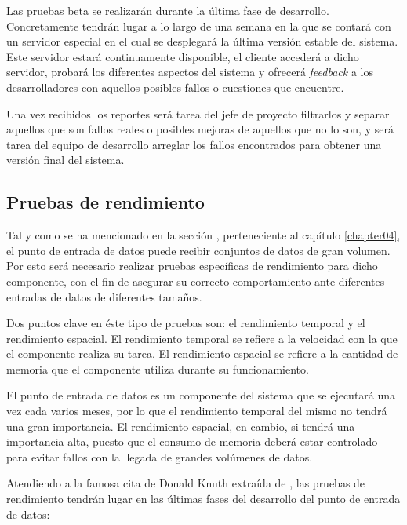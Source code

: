 Las pruebas beta se realizarán durante la última fase de desarrollo.  Concretamente tendrán lugar a lo largo de una semana en la que se contará con un servidor especial en el cual se desplegará la última versión estable del sistema.  Este servidor estará continuamente disponible, el cliente accederá a dicho servidor, probará los diferentes aspectos del sistema y ofrecerá \textit{feedback} a los desarrolladores con aquellos posibles fallos o cuestiones que encuentre.

Una vez recibidos los reportes será tarea del jefe de proyecto filtrarlos y separar aquellos que son fallos reales o posibles mejoras de aquellos que no lo son, y será tarea del equipo de desarrollo arreglar los fallos encontrados para obtener una versión final del sistema.


\subsection{Pruebas de rendimiento}
Tal y como se ha mencionado en la sección , perteneciente al capítulo \ref{chapter04}, el punto de entrada de datos puede recibir conjuntos de datos de gran volumen.  Por esto será necesario realizar pruebas específicas de rendimiento para dicho componente, con el fin de asegurar su correcto comportamiento ante diferentes entradas de datos de diferentes tamaños.

Dos puntos clave en éste tipo de pruebas son: el rendimiento temporal y el rendimiento espacial.  El rendimiento temporal se refiere a la velocidad con la que el componente realiza su tarea.  El rendimiento espacial se refiere a la cantidad de memoria que el componente utiliza durante su funcionamiento.

El punto de entrada de datos es un componente del sistema que se ejecutará una vez cada varios meses, por lo que el rendimiento temporal del mismo no tendrá una gran importancia.  El rendimiento espacial, en cambio, si tendrá una importancia alta, puesto que el consumo de memoria deberá estar controlado para evitar fallos con la llegada de grandes volúmenes de datos.

Atendiendo a la famosa cita de Donald Knuth extraída de \cite{knuth:structuredprogramming}, las pruebas de rendimiento tendrán lugar en las últimas fases del desarrollo del punto de entrada de datos:  


